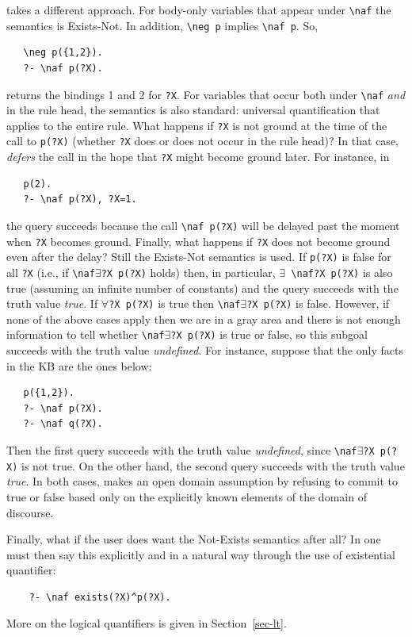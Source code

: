 \documentclass[11pt]{article}
\newcommand{\ERGO}{\mbox{\smaller{\ensuremath{\cal{E}}\smaller{{\sc{RGO}}}}}\xspace}
\newcommand{\FLSYSTEM}{\ERGO}
\newcommand{\bs}{\textbackslash}
\newcommand{\RULELOGNAF}{{\texttt{{\bs}naf}}\xspace}
\newcommand{\RULELOGNEG}{{\texttt{{\bs}neg}}\xspace}
\begin{document}
\FLSYSTEM takes a different approach. For body-only variables that appear
under \texttt{\RULELOGNAF} the semantics is Exists-Not. In addition, \texttt{\RULELOGNEG p}
implies \texttt{\RULELOGNAF p}. So,
\begin{verbatim}
   \neg p({1,2}).
   ?- \naf p(?X).
\end{verbatim}
returns the bindings 1 and 2 for \texttt{?X}. For variables that occur both
under \texttt{\RULELOGNAF} \emph{and} in the rule head, the semantics is also standard:
universal quantification that applies to the entire rule.
What happens if \texttt{?X} is not ground at the time of the call to
\texttt{p(?X)} (whether \texttt{?X} does or does not occur in the rule head)?
In that case, \FLSYSTEM \emph{defers} the call in the hope that \texttt{?X}
might become ground later. For instance, in
\begin{verbatim}
   p(2).
   ?- \naf p(?X), ?X=1.
\end{verbatim}
the query succeeds because the call \texttt{\RULELOGNAF p(?X)} will be delayed past
the moment when \texttt{?X} becomes ground.   
Finally, what happens if \texttt{?X} does not become ground even after the
delay? Still the Exists-Not semantics is used. If \texttt{p(?X)} is false
for all \texttt{?X} (i.e., if \texttt{\RULELOGNAF $\exists$?X p(?X)} holds) then, in
particular, \texttt{$\exists$ \RULELOGNAF ?X p(?X)} is also true (assuming an
infinite number of constants) and the query
succeeds with the truth value \emph{true}.
If \texttt{$\forall$?X p(?X)} is true then \texttt{\RULELOGNAF $\exists$?X
  p(?X)}  is false.  
However, if none of the above cases apply then we are in a gray area
and there is not enough information to tell whether
\texttt{\RULELOGNAF $\exists$?X p(?X)} is true or false, so this subgoal
succeeds with the truth
value \emph{undefined}. For instance, suppose that the only facts in the KB
are the ones below:
\begin{verbatim}
   p({1,2}).
   ?- \naf p(?X).
   ?- \naf q(?X).
\end{verbatim}
Then the first query succeeds with the truth value \emph{undefined}, since
\texttt{\RULELOGNAF $\exists$?X p(?X)} is not true. On the other hand, the second
query succeeds with the truth value \emph{true}. 
In both cases, \FLSYSTEM makes an open domain assumption by refusing to commit
to true or false based only on the explicitly known elements of the domain
of discourse.

Finally, what if the user does want the Not-Exists semantics after all?
In \FLSYSTEM one must then say this explicitly and in a natural way through
the use of existential quantifier:
\begin{verbatim}
    ?- \naf exists(?X)^p(?X).
\end{verbatim}
More on the logical quantifiers is given in Section~\ref{sec-lt}.
\end{document}
